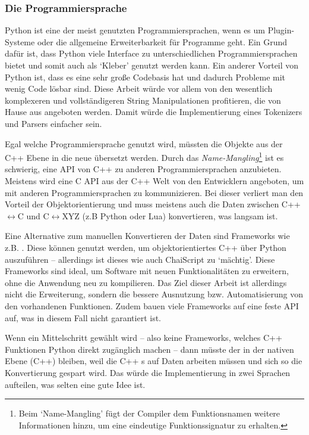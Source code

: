     \subsubsection{Die Programmiersprache}
    \label{sssec:Die Programmiersprache}
      Python ist eine der meist genutzten Programmiersprachen, wenn es um Plugin-Systeme oder die allgemeine Erweiterbarkeit für Programme geht. Ein Grund dafür ist, dass Python viele Interface zu unterschiedlichen Programmiersprachen bietet und somit auch als `Kleber' genutzt werden kann. Ein anderer Vorteil von Python ist, dass es eine sehr große Codebasis hat und dadurch Probleme mit wenig Code lösbar sind. Diese Arbeit würde vor allem von den wesentlich komplexeren und vollständigeren String Manipulationen profitieren, die von Hause aus angeboten werden. Damit würde die Implementierung eines Tokenizers und Parsers einfacher sein.

      Egal welche Programmiersprache genutzt wird, müssten die Objekte aus der C++ Ebene in die neue übersetzt werden. Durch das \emph{Name-Mangling}\footnote{
        Beim `Name-Mangling' fügt der Compiler dem Funktionsnamen weitere Informationen hinzu, um eine eindeutige Funktionssignatur zu erhalten.
      } ist es schwierig, eine API von C++ zu anderen Programmiersprachen anzubieten. Meistens wird eine C API aus der C++ Welt von den Entwicklern angeboten, um mit anderen Programmiersprachen zu kommunizieren. Bei dieser verliert man den Vorteil der Objektorientierung und muss meistens auch die Daten zwischen C++$\longleftrightarrow$C und C$\longleftrightarrow$XYZ (z.B Python oder Lua) konvertieren, was langsam ist.

      Eine Alternative zum manuellen Konvertieren der Daten sind Frameworks wie z.B. . Diese können genutzt werden, um objektorientiertes C++ über Python auszuführen -- allerdings ist dieses wie auch ChaiScript zu `mächtig'. Diese Frameworks sind ideal, um Software mit neuen Funktionalitäten zu erweitern, ohne die Anwendung neu zu kompilieren. Das Ziel dieser Arbeit ist allerdings nicht die Erweiterung, sondern die bessere Ausnutzung bzw. Automatisierung von den vorhandenen Funktionen. Zudem bauen viele Frameworks auf eine feste API auf, was in diesem Fall nicht garantiert ist.

      Wenn ein Mittelschritt gewählt wird -- also keine Frameworks, welches C++ Funktionen Python direkt zugänglich machen -- dann müsste der  in der nativen Ebene (C++) bleiben, weil die C++ s auf Daten arbeiten müssen und sich so die Konvertierung gespart wird. Das würde die Implementierung in zwei Sprachen aufteilen, was selten eine gute Idee ist.

